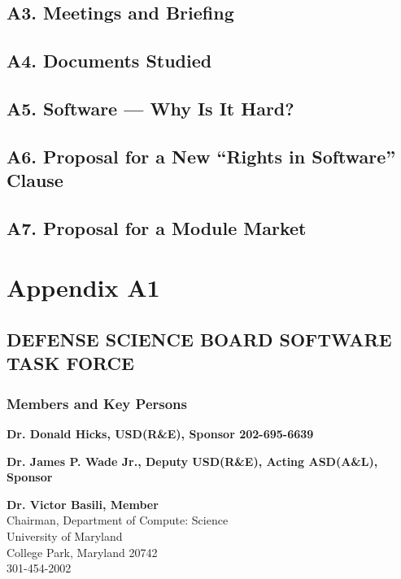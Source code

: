 \documentclass[12pt,final]{article}
\begin{document}
\subsection*{A3. Meetings and Briefing}

\subsection*{A4. Documents Studied}

\subsection*{A5. Software — Why Is It Hard?}

\subsection*{A6. Proposal for a New “Rights in Software” Clause}

\subsection*{A7. Proposal for a Module Market}

\newpage

\section*{Appendix A1}
\begin{centering}

\subsection*{DEFENSE SCIENCE BOARD SOFTWARE TASK FORCE}

\subsubsection*{Members and Key Persons}
\end{centering}

\textbf{Dr. Donald Hicks, USD(R\&E), Sponsor 202-695-6639}

\medskip

\textbf{Dr. James P. Wade Jr., Deputy USD(R\&E), Acting ASD(A\&L), Sponsor}

\medskip

\textbf{Dr. Victor Basili, Member}\\
\hspace*{2cm}Chairman, Department of Compute: Science\\
\hspace*{2cm}University of Maryland\\
\hspace*{2cm}College Park, Maryland 20742\\
\hspace*{2cm}301-454-2002
\end{document}
